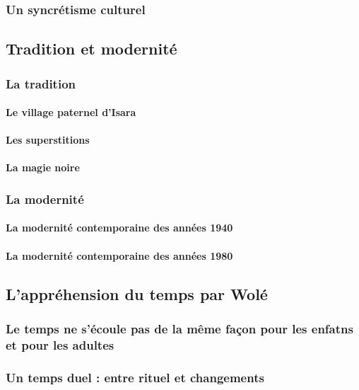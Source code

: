 \documentclass[a4paper, 11pt, hidelinks]{article}
\begin{document}
\subsubsection{Un syncrétisme culturel}


\subsection{Tradition et modernité}


\subsubsection{La tradition}


\paragraph{Le village paternel d'Isara}




\paragraph{Les superstitions}



\paragraph{La magie noire}




\subsubsection{La modernité}



\paragraph{La modernité contemporaine des années 1940}



\paragraph{La modernité contemporaine des années 1980}



\subsection{L'appréhension du temps par Wolé}


\subsubsection{Le temps ne s'écoule pas de la même façon pour les enfatns et pour les adultes}




\subsubsection{Un temps duel : entre rituel et changements}
\end{document}

